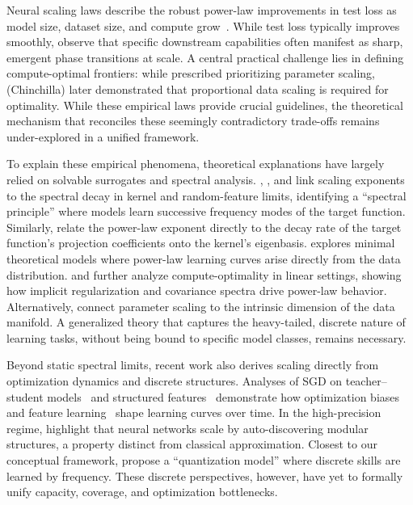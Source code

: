\documentclass{article}
\theoremstyle{plain}
\theoremstyle{definition}
\theoremstyle{remark}
\begin{document}
Neural scaling laws describe the robust power-law improvements in test loss as model size, dataset size, and compute grow~\citep{hestness2017deeplearningscalingpredictable,kaplan2020scalinglawsneurallanguage}. While test loss typically improves smoothly, \citet{wei2022emergentabilitieslargelanguage} observe that specific downstream capabilities often manifest as sharp, emergent phase transitions at scale. A central practical challenge lies in defining compute-optimal frontiers: while \citet{kaplan2020scalinglawsneurallanguage} prescribed prioritizing parameter scaling, \citet{hoffmann2022trainingcomputeoptimallargelanguage} (Chinchilla) later demonstrated that proportional data scaling is required for optimality. While these empirical laws provide crucial guidelines, the theoretical mechanism that reconciles these seemingly contradictory trade-offs remains under-explored in a unified framework.

To explain these empirical phenomena, theoretical explanations have largely relied on solvable surrogates and spectral analysis. \citet{Bahri_2024}, \citet{maloney2022solvablemodelneuralscaling}, and \citet{bordelon2021spectrumdependentlearningcurves} link scaling exponents to the spectral decay in kernel and random-feature limits, identifying a ``spectral principle'' where models learn successive frequency modes of the target function. Similarly, \citet{Spigler_2020} relate the power-law exponent directly to the decay rate of the target function's projection coefficients onto the kernel's eigenbasis. \citet{hutter2021learningcurvetheory,pan2025understandingllmbehaviorscompression} explores minimal theoretical models where power-law learning curves arise directly from the data distribution. \citet{paquette202543phasescomputeoptimalneural} and \citet{lin2025scalinglawslinearregression} further analyze compute-optimality in linear settings, showing how implicit regularization and covariance spectra drive power-law behavior. Alternatively, \citet{sharma2020neuralscalinglawdimension} connect parameter scaling to the intrinsic dimension of the data manifold. A generalized theory that captures the heavy-tailed, discrete nature of learning tasks, without being bound to specific model classes, remains necessary.

Beyond static spectral limits, recent work also derives scaling directly from optimization dynamics and discrete structures. Analyses of SGD on teacher--student models~\citep{ren2025emergencescalinglawssgd,arous2025learningquadraticneuralnetworks} and structured features~\citep{bordelon2022learningcurvessgdstructured,bordelon2024dynamicalmodelneuralscaling} demonstrate how optimization biases and feature learning~\citep{bordelon2025featurelearningimproveneural} shape learning curves over time. In the high-precision regime, \citet{Michaud_2023} highlight that neural networks scale by auto-discovering modular structures, a property distinct from classical approximation. Closest to our conceptual framework, \citet{michaud2024quantizationmodelneuralscaling} propose a ``quantization model'' where discrete skills are learned by frequency. These discrete perspectives, however, have yet to formally unify capacity, coverage, and optimization bottlenecks.
\end{document}
